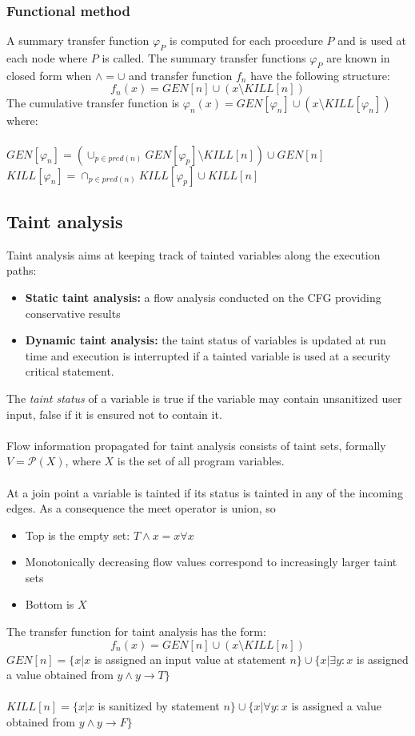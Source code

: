 \documentclass[10pt,a4paper]{article}
\begin{document}
\subsubsection{Functional method}
A summary transfer function $\varphi_P$ is computed for each procedure $P$ and is used at each node where $P$ is called. The summary transfer functions $\varphi_P$ are known in closed form when $\wedge = \cup$ and transfer function $f_n$ have the following structure:
$$ f_n(x) = GEN[n] \cup (x \setminus KILL[n])$$
The cumulative transfer function is $\varphi_n(x) = GEN[\varphi_n] \cup (x \setminus KILL[\varphi_n])$ where:\\\\
$ GEN[\varphi_n] = (\cup_{p\in pred(n)}GEN[\varphi_p] \setminus KILL[n]) \cup GEN[n]$\\
$ KILL[\varphi_n] = \cap_{p\in pred(n)}KILL[\varphi_p]\cup KILL[n]$
\newpage
\subsection{Taint analysis}
Taint analysis aims at keeping track of tainted variables along the execution paths:
\begin{itemize}
\item {\bf Static taint analysis:} a flow analysis conducted on the CFG providing conservative results
\item {\bf Dynamic taint analysis:} the taint status of variables is updated at run time and execution is interrupted if a tainted variable is used at a security critical statement.
\end{itemize}
The \emph{taint status} of a variable is true if the variable may contain unsanitized user input, false if it is ensured not to contain it.\\\\
Flow  information propagated for taint analysis consists of taint sets, formally $V = \mathcal{P}(X)$, where $X$ is the set of all program variables.\\\\
At a join point a variable is tainted if its status is tainted in any of the incoming edges. As a consequence the meet operator is union, so
\begin{itemize}
\item Top is the empty set: $T \wedge x = x \forall x$
\item Monotonically decreasing flow values correspond to increasingly larger taint sets
\item Bottom is $X$
\end{itemize}
The transfer function for taint analysis has the form:
$$ f_n(x) = GEN[n] \cup (x \setminus KILL[n])$$
$GEN[n] = \{ x | x $ is assigned an input value at statement $n \} \cup \{ x | \exists y: x$ is assigned a value obtained from $y \wedge y \to T\}$\\\\
$KILL[n] = \{x|x$ is sanitized by statement $n \} \cup \{ x| \forall y: x $ is assigned a value obtained from $y \wedge y \to F \}$\\\\
\end{document}
